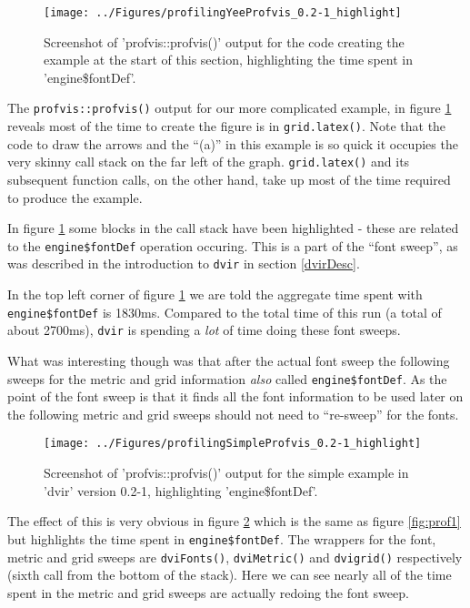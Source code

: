 \documentclass[]{article}
\begin{document}
\begin{figure}

{\centering \texttt{[image: ../Figures/profilingYeeProfvis\_0.2-1\_highlight]} 

}

\caption{Screenshot of 'profvis::profvis()' output for the code creating the example at the start of this section, highlighting the time spent in 'engine\$fontDef'.}\label{fig:prof2}
\end{figure}

The \texttt{profvis::profvis()} output for our more complicated example,
in figure \ref{fig:prof2} reveals most of the time to create the figure
is in \texttt{grid.latex()}. Note that the code to draw the arrows and
the ``(a)'' in this example is so quick it occupies the very skinny call
stack on the far left of the graph. \texttt{grid.latex()} and its
subsequent function calls, on the other hand, take up most of the time
required to produce the example.

In figure \ref{fig:prof2} some blocks in the call stack have been
highlighted - these are related to the \texttt{engine\$fontDef}
operation occuring. This is a part of the ``font sweep'', as was
described in the introduction to \texttt{dvir} in section
\ref{dvirDesc}.

In the top left corner of figure \ref{fig:prof2} we are told the
aggregate time spent with \texttt{engine\$fontDef} is 1830ms. Compared
to the total time of this run (a total of about 2700ms), \texttt{dvir}
is spending a \emph{lot} of time doing these font sweeps.

What was interesting though was that after the actual font sweep the
following sweeps for the metric and grid information \emph{also} called
\texttt{engine\$fontDef}. As the point of the font sweep is that it
finds all the font information to be used later on the following metric
and grid sweeps should not need to ``re-sweep'' for the fonts.

\begin{figure}

{\centering \texttt{[image: ../Figures/profilingSimpleProfvis\_0.2-1\_highlight]} 

}

\caption{Screenshot of 'profvis::profvis()' output for the simple example in 'dvir' version 0.2-1, highlighting 'engine\$fontDef'.}\label{fig:prof3}
\end{figure}

The effect of this is very obvious in figure \ref{fig:prof3} which is
the same as figure \ref{fig:prof1} but highlights the time spent in
\texttt{engine\$fontDef}. The wrappers for the font, metric and grid
sweeps are \texttt{dviFonts()}, \texttt{dviMetric()} and
\texttt{dvigrid()} respectively (sixth call from the bottom of the
stack). Here we can see nearly all of the time spent in the metric and
grid sweeps are actually redoing the font sweep.
\end{document}
